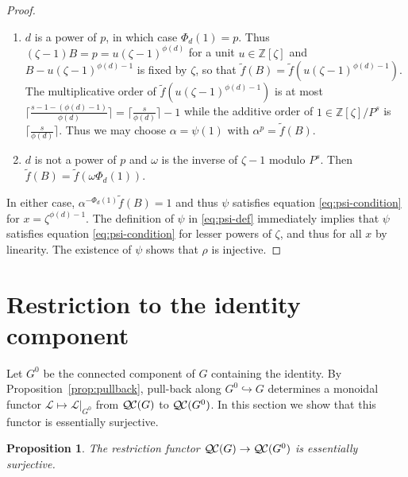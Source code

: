 \documentclass[11pt]{amsart}
\theoremstyle{plain}
\newtheorem{proposition}[theorem]{Proposition}
\theoremstyle{definition}
\theoremstyle{remark}
\newcommand{\ZZ}{{\mathbb{Z}}}
\newcommand{\cs}[1]{{\mathcal{#1}}}
\newcommand{\QC}{{\mathcal{Q\hskip-0.8pt C}}}
\begin{document}
\begin{proof}
  \begin{enumerate}
  \item $d$ is a power of $p$, in which case $\Phi_d(1) = p$.  Thus
    $(\zeta-1)B = p = u(\zeta-1)^{\phi(d)}$ for a unit $u \in \ZZ[\zeta]$
    and $B - u(\zeta-1)^{\phi(d)-1}$ is fixed by $\zeta$,
    so that $\tilde{f}(B) = \tilde{f}(u(\zeta - 1)^{\phi(d)-1})$.  The
    multiplicative order of $\tilde{f}(u(\zeta-1)^{\phi(d)-1})$ is at most
    $\lceil \frac{s - 1 - (\phi(d)-1)}{\phi(d)}\rceil = \lceil \frac{s}{\phi(d)} \rceil - 1$
    while the additive order of $1 \in \ZZ[\zeta]/P^s$ is $\lceil \frac{s}{\phi(d)} \rceil$.
    Thus we may choose $\alpha = \psi(1)$ with $\alpha^p = \tilde{f}(B)$.
  \item $d$ is not a power of $p$ and $\omega$ is the inverse of
    $\zeta-1$ modulo $P^s$.  Then $\tilde{f}(B) = \tilde{f}(\omega\Phi_d(1))$.
  \end{enumerate}
  In either case, $\alpha^{-\Phi_d(1)}\tilde{f}(B) = 1$ and thus
  $\psi$ satisfies equation \ref{eq:psi-condition} for
  $x = \zeta^{\phi(d)-1}$.  The definition of $\psi$ in \ref{eq:psi-def}
  immediately implies that $\psi$ satisfies equation
  \ref{eq:psi-condition} for lesser powers of $\zeta$, and thus for
  all $x$ by linearity.  The existence of $\psi$ shows that $\rho$ is injective.
\end{proof}

\section{Restriction to the identity component} \label{sec:restriction}

%

Let $G^0$ be the connected component of $G$ containing the identity.
By Proposition~\ref{prop:pullback}, pull-back along
$G^0\hookrightarrow G$ determines a monoidal functor
$\cs{L}\mapsto \cs{L}\vert_{G^0}$ from $\QC(G)$ to $\QC(G^0)$.  In
this section we show that this functor is essentially surjective. 

\begin{proposition}\label{prop:restriction}
  The restriction functor $\QC(G)\to \QC(G^0)$ is essentially surjective.
\end{proposition}
\end{document}
